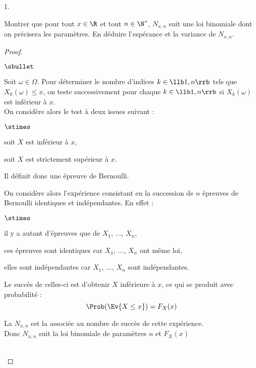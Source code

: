 \begin{noliste}{1.}
  \setlength{\itemsep}{4mm}
  \setcounter{enumi}{5}
  \item Montrer que pour tout $x \in \R$ et tout $n \in \N^*$, 
  $N_{x,n}$ suit une loi binomiale dont on précisera les 
  paramètres. En déduire l'espérance et la variance de $N_{x,n}$.
  
  \begin{proof}~
  \begin{noliste}{$\sbullet$}
    \item Soit $\omega \in \Omega$. Pour déterminer le nombre d'indices 
    $k \in \llb 1,n \rrb$ tels que $X_k(\omega) \leq x$, on teste 
    successivement pour chaque $k \in \llb 1, n \rrb$ si $X_k(\omega)$
    est inférieur à $x$.\\
    On considère alors le test à deux issues suivant :
    \begin{noliste}{$\stimes$}
      \item soit $X$ est inférieur à $x$,
      \item soit $X$ est strictement supérieur à $x$.
    \end{noliste}
    Il définit donc une épreuve de Bernoulli.
    
    \item On considère alors l'expérience consistant en la succession 
    de $n$ épreuves de Bernoulli identiques et indépendantes.
    En effet :
    \begin{noliste}{$\stimes$}
      \item il y a autant d'épreuves que de \var $X_1$, $\hdots$, $X_n$,
      \item ces épreuves sont identiques car $X_1$, $\hdots$, $X_n$ 
      ont même loi,
      \item elles sont indépendantes car $X_1$, $\hdots$, $X_n$ sont 
      indépendantes.
    \end{noliste}
    Le succès de celles-ci est d'obtenir $X$ inférieure 
    à $x$, ce qui se produit avec probabilité :
    \[
      \Prob(\Ev{X \leq x}) = F_X(x)
    \]
    \item La \var $N_{x,n}$ est la \var associée au nombre de 
    succès de cette expérience.\\
    Donc $N_{x,n}$ suit la loi binomiale de paramètres $n$ et $F_X(x)$
  \end{noliste}
  ~\\[-1cm]
  \end{proof}
  

\end{noliste}
